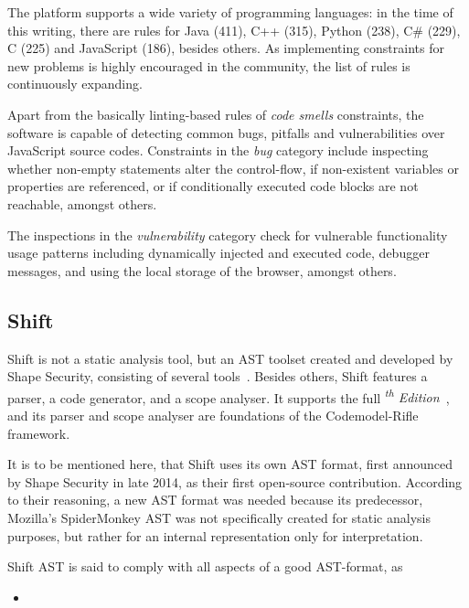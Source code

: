 The platform supports a wide variety of programming languages: in the time of this writing, there are rules for Java (411), C++ (315), Python (238), C\# (229), C (225) and JavaScript (186), besides others. As implementing constraints for new problems is highly encouraged in the community, the list of rules is continuously expanding.

Apart from the basically linting-based rules of \emph{code smells} constraints, the software is capable of detecting common bugs, pitfalls and vulnerabilities over JavaScript source codes. Constraints in the \emph{bug} category include inspecting whether non-empty statements alter the control-flow, if non-existent variables or properties are referenced, or if conditionally executed code blocks are not reachable, amongst others.

The inspections in the \emph{vulnerability} category check for vulnerable functionality usage patterns including dynamically injected and executed code, debugger messages, and using the local storage of the browser, amongst others.


\subsection{Shift}

Shift is not a static analysis tool, but an AST toolset created and developed by Shape Security, consisting of several tools~\cite{shift-ast}. Besides others, Shift features a parser, a code generator, and a scope analyser. It supports the full \emph{\textsuperscript{th} Edition}~\cite{shift-ast}, and its parser and scope analyser are foundations of the Codemodel-Rifle framework.

It is to be mentioned here, that Shift uses its own AST format, first announced by Shape Security in late 2014, as their first open-source contribution. According to their reasoning, a new \es AST format was needed because its predecessor, Mozilla's SpiderMonkey AST was not specifically created for static analysis purposes, but rather for an internal representation only for interpretation.

Shift AST is said to comply with all aspects of a good AST-format, as

\begin{itemize}
\item {}~\cite{shift-ast-comparison}
\end{itemize}

